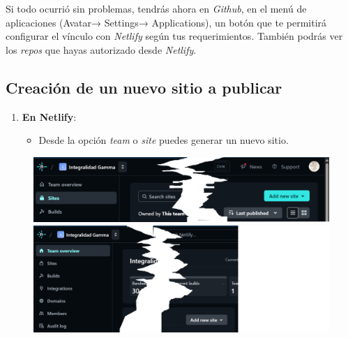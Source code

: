\documentclass[
  letterpaper,
  DIV=11,
  numbers=noendperiod]{scrartcl}
\providecommand{\tightlist}{%
  \setlength{\itemsep}{0pt}\setlength{\parskip}{0pt}}\usepackage{longtable,booktabs,array}
\begin{document}
Si todo ocurrió sin problemas, tendrás ahora en \emph{Github}, en el
menú de aplicaciones (Avatar→ Settings→ Applications), un botón que te
permitirá configurar el vínculo con \emph{Netlify} según tus
requerimientos. También podrás ver los \emph{repos} que hayas autorizado
desde \emph{Netlify}.

\subsection{Creación de un nuevo sitio a
publicar}\label{creaciuxf3n-de-un-nuevo-sitio-a-publicar}

\begin{enumerate}
\def\labelenumi{\arabic{enumi}.}
\item
  \textbf{En Netlify}:

  \begin{itemize}
  \tightlist
  \item
    Desde la opción \emph{team} o \emph{site} puedes generar un nuevo
    sitio.
  \end{itemize}
\end{enumerate}

\begin{figure}

\begin{minipage}{0.50\linewidth}
\includegraphics{images/Netlify-new-site.png}\end{minipage}%
%
\begin{minipage}{0.50\linewidth}
\includegraphics{images/Netlify-new-site-team.png}\end{minipage}%

\end{figure}%
\end{document}
